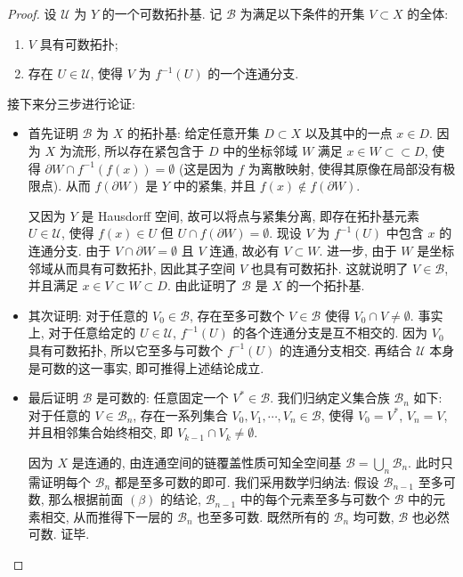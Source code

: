 \begin{proof}
设 $\mathcal{U}$ 为 $Y$ 的一个可数拓扑基. 记 $\mathcal{B}$ 为满足以下条件的开集 $V \subset X$ 的全体:
\begin{enumerate}
    \item $V$ 具有可数拓扑;
    \item 存在 $U \in \mathcal{U}$, 使得 $V$ 为 $f^{-1}(U)$ 的一个连通分支.
\end{enumerate}

接下来分三步进行论证:
\begin{itemize}
    \item [$(\alpha)$]\qquad 首先证明 $\mathcal{B}$ 为 $X$ 的拓扑基: 给定任意开集 $D \subset X$ 以及其中的一点 $x \in D$. 因为 $X$ 为流形, 所以存在紧包含于 $D$ 中的坐标邻域 $W$ 满足 $x \in W \subset\subset D$, 使得 $\partial W \cap f^{-1}(f(x)) = \emptyset$ (这是因为 $f$ 为离散映射, 使得其原像在局部没有极限点). 从而 $f(\partial W)$ 是 $Y$ 中的紧集, 并且 $f(x) \notin f(\partial W)$. 

    \qquad 又因为 $Y$ 是 Hausdorff 空间, 故可以将点与紧集分离, 即存在拓扑基元素 $U \in \mathcal{U}$, 使得 $f(x) \in U$ 但 $U \cap f(\partial W) = \emptyset$. 现设 $V$ 为 $f^{-1}(U)$ 中包含 $x$ 的连通分支. 由于 $V \cap \partial W = \emptyset$ 且 $V$ 连通, 故必有 $V \subset W$. 进一步, 由于 $W$ 是坐标邻域从而具有可数拓扑, 因此其子空间 $V$ 也具有可数拓扑. 这就说明了 $V \in \mathcal{B}$, 并且满足 $x \in V \subset W \subset D$. 由此证明了 $\mathcal{B}$ 是 $X$ 的一个拓扑基.

    \item [$(\beta)$]\qquad 其次证明: 对于任意的 $V_0 \in \mathcal{B}$, 存在至多可数个 $V \in \mathcal{B}$ 使得 $V_0 \cap V \neq \emptyset$. 事实上, 对于任意给定的 $U \in \mathcal{U}$, $f^{-1}(U)$ 的各个连通分支是互不相交的. 因为 $V_0$ 具有可数拓扑, 所以它至多与可数个 $f^{-1}(U)$ 的连通分支相交. 再结合 $\mathcal{U}$ 本身是可数的这一事实, 即可推得上述结论成立.

    \item[$(\gamma)$]\qquad 最后证明 $\mathcal{B}$ 是可数的: 任意固定一个 $V^* \in \mathcal{B}$. 我们归纳定义集合族 $\mathcal{B}_n$ 如下: 对于任意的 $V \in \mathcal{B}_n$, 存在一系列集合 $V_0, V_1, \cdots, V_n \in \mathcal{B}$, 使得 $V_0 = V^*$, $V_n = V$, 并且相邻集合始终相交, 即 $V_{k-1} \cap V_k \neq \emptyset$. 

\qquad 因为 $X$ 是连通的, 由连通空间的链覆盖性质可知全空间基 $\mathcal{B} = \bigcup_n \mathcal{B}_n$. 此时只需证明每个 $\mathcal{B}_n$ 都是至多可数的即可. 我们采用数学归纳法: 假设 $\mathcal{B}_{n-1}$ 至多可数, 那么根据前面 $(\beta)$ 的结论, $\mathcal{B}_{n-1}$ 中的每个元素至多与可数个 $\mathcal{B}$ 中的元素相交, 从而推得下一层的 $\mathcal{B}_n$ 也至多可数. 既然所有的 $\mathcal{B}_n$ 均可数, $\mathcal{B}$ 也必然可数. 证毕.
\end{itemize}
\end{proof}

